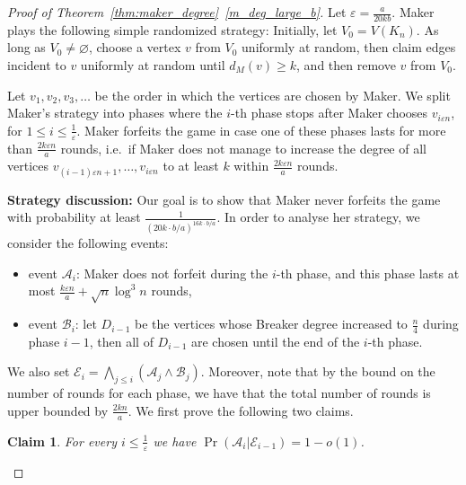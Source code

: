 \documentclass[11pt, a4paper]{article}
\numberwithin{equation}{section}
\numberwithin{figure}{section}
\newtheorem{claim}[theorem]{Claim}
\begin{document}
\begin{proof}[Proof of Theorem~\ref{thm:maker_degree}~\ref{m_deg_large_b}]
    Let $\varepsilon=\frac{a}{20kb}$.
	Maker plays the following simple randomized strategy:	
	Initially, let $V_0=V(K_n)$. As long as $V_0\neq \varnothing$,
	choose a vertex $v$ from $V_0$ uniformly at random, then claim edges incident to $v$ uniformly at random 
	until $d_M(v)\geq k$, and then remove $v$ from $V_0$.
			
	Let $v_1,v_2,v_3,\dots$ be the order in which the vertices 
	are chosen by Maker.	
	We split Maker's strategy into phases
	where the $i$-th phase stops after 
	Maker chooses $v_{i \varepsilon n }$, 
	for $1\leq i\leq \frac{1}{\varepsilon}$. 
	Maker forfeits the game in case one of these phases lasts for more than 
	$\frac{2k\varepsilon n}{a}$ rounds, i.e.~if Maker does not manage to increase
	the degree of all vertices $v_{(i-1)\varepsilon n + 1 },\ldots,
		v_{i \varepsilon n }$ to at least $k$
	within $\frac{2k\varepsilon n}{a}$ rounds.  
	


\medskip

{\bf Strategy discussion:}
Our goal is to show that Maker never forfeits the game with
probability at least $\frac{1}{(20k\cdot b/a)^{16k\cdot b/a}}$.
In order to analyse her strategy,  we consider the following events:
\begin{itemize}
\item event $\mathcal{A}_i$: Maker does not forfeit during the $i$-th phase, and this phase lasts at most $\frac{k\varepsilon n}{a} + \sqrt{n}\log^3 n$ rounds,
\item event $\mathcal{B}_i$: let $D_{i-1}$ be the vertices
whose Breaker degree increased to $\frac{n}{4}$ during phase $i-1$, then all of $D_{i-1}$ are chosen until the end of the $i$-th phase.
\end{itemize}
We also set $\mathcal{E}_i = \bigwedge_{j \leq i} (\mathcal{A}_j \land \mathcal{B}_j)$.
Moreover, note that by the bound on the number of rounds for each phase,
we have that the total number of rounds is upper bounded by $\frac{2kn}{a}$. We first prove the following two claims.

\smallskip

\begin{claim}
For every $i\leq \frac{1}{\varepsilon}$ we have $\operatorname{Pr}(\mathcal{A}_i|\mathcal{E}_{i-1}) = 1-o(1)$.
\end{claim}


\end{proof}
\end{document}
